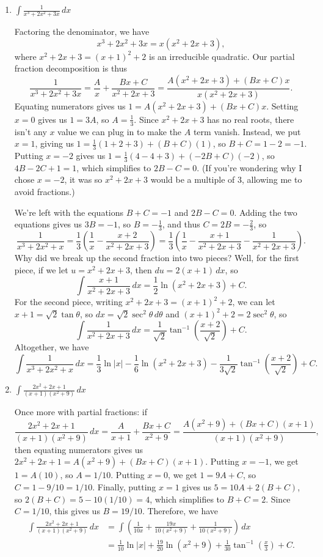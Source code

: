 \documentclass[12pt]{article}
\newcommand{\di}{\displaystyle}
\newcommand{\abs}[1]{\lvert #1\rvert}
\begin{document}
\begin{enumerate}
 \item $\di \int \frac{1}{x^3+2x^2+3x}\,dx$

Factoring the denominator, we have 
\[
 x^3+2x^2+3x = x(x^2+2x+3),
\]
where $x^2+2x+3 = (x+1)^2+2$ is an irreducible quadratic. Our partial fraction decomposition is thus
\[
 \frac{1}{x^3+2x^2+3x} = \frac{A}{x}+\frac{Bx+C}{x^2+2x+3} = \frac{A(x^2+2x+3)+(Bx+C)x}{x(x^2+2x+3)}.
\]
Equating numerators gives us $1 = A(x^2+2x+3)+(Bx+C)x$. Setting $x=0$ gives us $1=3A$, so $A=\frac{1}{3}$. Since $x^2+2x+3$ has no real roots, there isn't any $x$ value we can plug in to make the $A$ term vanish. Instead, we put $x=1$, giving us $1=\frac{1}{3}(1+2+3)+(B+C)(1)$, so $B+C=1-2 = -1$. Putting $x=-2$ gives us $1=\frac{1}{3}(4-4+3)+(-2B+C)(-2)$, so $4B-2C+1=1$, which simplifies to $2B-C=0$. (If you're wondering why I chose $x=-2$, it was so $x^2+2x+3$ would be a multiple of 3, allowing me to avoid fractions.)

We're left with the equations $B+C=-1$ and $2B-C=0$. Adding the two equations gives us $3B=-1$, so $B=-\frac{1}{3}$, and thus $C=2B = -\frac{2}{3}$, so 
\[
 \frac{1}{x^3+2x^2+x} = \frac{1}{3}\left(\frac{1}{x}-\frac{x+2}{x^2+2x+3}\right) = \frac{1}{3}\left(\frac{1}{x}-\frac{x+1}{x^2+2x+3}-\frac{1}{x^2+2x+3}\right).
\]
Why did we break up the second fraction into two pieces? Well, for the first piece, if we let $u=x^2+2x+3$, then $du = 2(x+1)\,dx$, so
\[
 \int \frac{x+1}{x^2+2x+3}\,dx = \frac{1}{2}\ln(x^2+2x+3)+C.
\]
For the second piece, writing $x^2+2x+3 = (x+1)^2+2$, we can let $x+1=\sqrt{2}\tan\theta$, so $dx = \sqrt{2}\sec^2\theta\,d\theta$ and $(x+1)^2+2 = 2\sec^2\theta$, so
\[
 \int\frac{1}{x^2+2x+3}\,dx = \frac{1}{\sqrt{2}}\tan^{-1}\left(\frac{x+2}{\sqrt{2}}\right)+C.
\]
Altogether, we have
\[
 \int\frac{1}{x^3+2x^2+x}\,dx = \frac{1}{3}\ln\abs{x}-\frac{1}{6}\ln(x^2+2x+3)-\frac{1}{3\sqrt{2}}\tan^{-1}\left(\frac{x+2}{\sqrt{2}}\right)+C.
\]



 \item $\di \int \frac{2x^2+2x+1}{(x+1)(x^2+9)}\,dx$

Once more with partial fractions: if
\[
 \frac{2x^2+2x+1}{(x+1)(x^2+9)}\,dx = \frac{A}{x+1}+\frac{Bx+C}{x^2+9} = \frac{A(x^2+9)+(Bx+C)(x+1)}{(x+1)(x^2+9)},
\]
then equating numerators gives us $2x^2+2x+1 = A(x^2+9)+(Bx+C)(x+1)$. Putting $x=-1$, we get $1=A(10)$, so $A=1/10$. Putting $x=0$, we get $1=9A+C$, so $C=1-9/10=1/10$. Finally, putting $x=1$ gives us $5=10A+2(B+C)$, so $2(B+C)=5-10(1/10)=4$, which simplifies to $B+C=2$. Since $C=1/10$, this gives us $B=19/10$. Therefore, we have
\begin{align*}
 \int\frac{2x^2+2x+1}{(x+1)(x^2+9)}\,dx &= \int\left(\frac{1}{10x}+\frac{19x}{10(x^2+9)}+\frac{1}{10(x^2+9)}\right)\,dx\\
& = \frac{1}{10}\ln\abs{x}+\frac{19}{20}\ln(x^2+9)+\frac{1}{30}\tan^{-1}\left(\frac{x}{3}\right)+C.
\end{align*}


 
 \end{enumerate}
\end{document}
